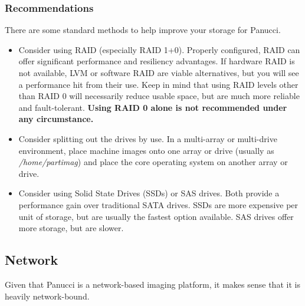 \documentclass{article}
\begin{document}
\subsubsection{Recommendations}
There are some standard methods to help improve your storage for Panucci.
\begin{itemize}
  \item Consider using RAID (especially RAID 1+0).  Properly configured, RAID can offer significant performance and resiliency advantages.  If hardware RAID is not available, LVM or software RAID are viable alternatives, but you will see a performance hit from their use.  Keep in mind that using RAID levels other than RAID 0 will necessarily reduce usable space, but are much more reliable and fault-tolerant.  \textbf{Using RAID 0 alone is not recommended under any circumstance.}
  \item Consider splitting out the drives by use.  In a multi-array or multi-drive environment, place machine images onto one array or drive (usually as \textit{/home/partimag}) and place the core operating system on another array or drive.
  \item Consider using Solid State Drives (SSDs) or SAS drives.  Both provide a performance gain over traditional SATA drives.  SSDs are more expensive per unit of storage, but are usually the fastest option available.  SAS drives offer more storage, but are slower.
\end{itemize}
\subsection{Network}
Given that Panucci is a network-based imaging platform, it makes sense that it is heavily network-bound.
\end{document}
